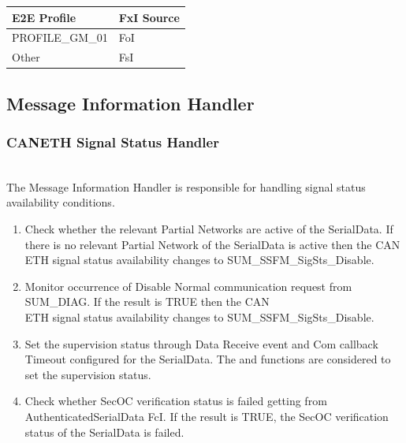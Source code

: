 \begin{table}[H]
    \begin{tabular}{|l|l|}
    \hline
    \textbf{E2E Profile} &  \textbf{FxI Source}\\ \hline
    PROFILE_GM_01                  & FoI \\ \hline
    Other                          & FsI \\ \hline
    \end{tabular}
\end{table}

{}


\subsection{Message Information Handler}
\subsubsection{CANETH Signal Status Handler}
\label{sec:Can_signal_status}
\\
The Message Information Handler is responsible for handling signal status availability conditions. 
\begin{enumerate}
    \item Check whether the relevant Partial Networks are active of the SerialData. If there is no relevant Partial Network of the SerialData is active then the CAN\\ETH signal status availability changes to SUM_SSFM_SigSts_Disable.
    \item Monitor occurrence of Disable Normal communication request from SUM_DIAG. If the result is TRUE then the CAN\\ETH signal status availability changes to SUM_SSFM_SigSts_Disable.
    \item Set the supervision status through Data Receive event and Com callback Timeout configured for the SerialData. The  and  functions are considered to set the supervision status.
    \item Check whether SecOC verification status is failed getting from AuthenticatedSerialData FcI. If the result is TRUE, the SecOC verification status of the SerialData is failed.
\end{enumerate}

{       }

